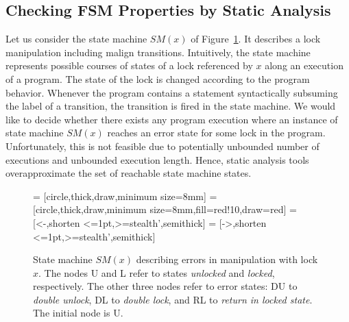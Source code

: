 \documentclass[10pt]{llncs}
\newcommand\Color[2]{\textcolor{#1}{#2}}
\newcommand{\nb}[1]{\marginpar{\scriptsize #1}}
\renewcommand\note[1]{\nb{\Color{blue}{#1}}}
\newcommand{\SM}{{\textit{SM}}}
\renewcommand\note[1]{#1}
\begin{document}
\subsection{Checking FSM Properties by Static Analysis}\label{ssec:static}

Let us consider the state machine $\SM(x)$ of Figure~\ref{fig:sm}. It
describes a lock manipulation including malign transitions. Intuitively, the
state machine represents possible courses of states of a lock referenced by
$x$ along an execution of a
program. %
The state of the lock is changed according to the program behavior. Whenever
the program contains a statement syntactically subsuming the label of a
transition, the transition is fired in the state machine. We would like to
decide whether there exists any program execution where an instance of state
machine $\SM(x)$ reaches an error state for some lock in the program.
Unfortunately, this is not feasible due to potentially unbounded number of
executions and unbounded execution length. Hence, static analysis tools
overapproximate the set of reachable state machine states.

\begin{figure}[tb]
  \centering
     = [circle,thick,draw,minimum size=8mm]
     = [circle,thick,draw,minimum size=8mm,fill=red!10,draw=red]
     = [<-,shorten <=1pt,>=stealth',semithick]
     = [->,shorten <=1pt,>=stealth',semithick]
    \caption{State machine $\SM(x)$ describing errors in manipulation with
      lock $x$. The nodes U and L refer to states \emph{unlocked} and
      \emph{locked}, respectively. The other three nodes refer to error
      states: DU to \emph{double unlock}, DL to \emph{double lock}, and RL
      to \emph{return in locked state}. The initial node is U.}
  \label{fig:sm}
\end{figure}
\end{document}
